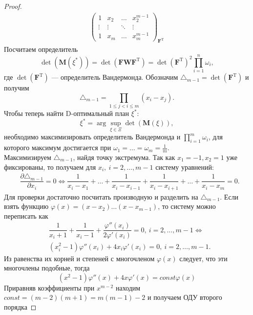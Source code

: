 \documentclass[12pt, a4paper]{article}
\begin{document}
\begin{proof}
\begin{align*}
{\begin{pmatrix}
				1&x_2&\dots&x_2^{m-1}\\
				\vdots&\vdots&\ddots&\vdots\\
				1&x_m&\dots&x_m^{m-1}
			\end{pmatrix}}_{\mathbf{F}^\mathrm{T}}
		\end{align*}
		Посчитаем определитель
		\begin{equation}\label{eqn:m_sup}
			\det(\mathbf{M}(\xi^*))=\det(\mathbf{FWF}^\mathrm{T})=\det(\mathbf{F}^\mathrm{T})^2\prod_{i=1}^n\omega_i,
		\end{equation}
		где $\det(\mathbf{F}^\mathrm{T})$ --- определитель Вандермонда. Обозначим $\triangle_{m-1}=\det(\mathbf{F}^\mathrm{T})$ и получим
		\begin{equation*}
			\triangle_{m-1}=\prod_{1\leqslant j < i\leqslant m}(x_i - x_j).
		\end{equation*}
		Чтобы теперь найти D-оптимальный план $\xi^*$:
		\begin{equation*}
			\xi^*=\arg\sup_{\xi\in\Xi}\det(\mathbf{M}(\xi)),
		\end{equation*}
		необходимо максимизировать определитель Вандермонда и $\prod_{i=1}^m\omega_i$, для которого максимум достигается при $\omega_1 = \dots = \omega_m=\frac{1}{m}$.\\
		Максимизируем $\triangle_{m-1}$, найдя точку экстремума. Так как $x_1=-1, x_2=1$ уже фиксированы, то получаем для $x_i,~i=2,\dots,m-1$ систему уравнений:
		\begin{align*}
			&\dfrac{\partial\triangle_{m-1}}{\partial x_i}=0\Leftrightarrow\dfrac{1}{x_i-x_1}+\dots+\dfrac{1}{x_i-x_{i-1}}+\dfrac{1}{x_i-x_{i+1}}+\dots+\dfrac{1}{x_i-x_m}=0.
		\end{align*}
		Для проверки достаточно посчитать производную и разделить на $\triangle_{m-1}$. Если взять функцию $\varphi(x) = (x-x_2)\dots(x-x_{m-1})$, то систему можно переписать как
		\begin{align*}
			&\dfrac{1}{x_i+1}+\dfrac{1}{x_i-1}+\dfrac{\varphi''(x_i)}{2\varphi'(x_i)}=0,~i=2,\dots,m-1\Leftrightarrow\\
			&(x_i^2-1)\varphi''(x_i)+4x_i\varphi'(x_i)=0,~i=2,\dots,m-1.
		\end{align*}
		Из равенства их корней и степеней с многочленом $\varphi(x)$ следует, что эти многочлены подобные, тогда
		\begin{equation*}
			(x^2-1)\varphi''(x)+4x\varphi'(x)=const\varphi(x)
		\end{equation*} 
		Приравняв коэффициенты при $x^{m-2}$ находим $const = (m-2)(m+1) = m(m-1)-2$ и получаем ОДУ второго порядка

\end{proof}
\end{document}
